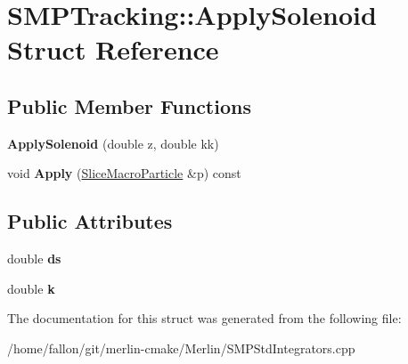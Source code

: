 \hypertarget{structSMPTracking_1_1ApplySolenoid}{}\section{S\+M\+P\+Tracking\+:\+:Apply\+Solenoid Struct Reference}
\label{structSMPTracking_1_1ApplySolenoid}
\subsection*{Public Member Functions}
\begin{DoxyCompactItemize}
\item 
\mbox{\label{structSMPTracking_1_1ApplySolenoid_a2a7455e6ec7498069e99c8d9f723e0ae}} 
{\bfseries Apply\+Solenoid} (double z, double kk)
\item 
\mbox{\label{structSMPTracking_1_1ApplySolenoid_a71cbd831953e1f250324d0f56036a495}} 
void {\bfseries Apply} (\hyperlink{classSMPTracking_1_1SliceMacroParticle}{Slice\+Macro\+Particle} \&p) const
\end{DoxyCompactItemize}
\subsection*{Public Attributes}
\begin{DoxyCompactItemize}
\item 
\mbox{\label{structSMPTracking_1_1ApplySolenoid_aa91fb3bb33ba0f696b7454a556efaea6}} 
double {\bfseries ds}
\item 
\mbox{\label{structSMPTracking_1_1ApplySolenoid_a96a8424bd0388661bc0593236c3c0ba6}} 
double {\bfseries k}
\end{DoxyCompactItemize}


The documentation for this struct was generated from the following file\+:\begin{DoxyCompactItemize}
\item 
/home/fallon/git/merlin-\/cmake/\+Merlin/S\+M\+P\+Std\+Integrators.\+cpp\end{DoxyCompactItemize}
